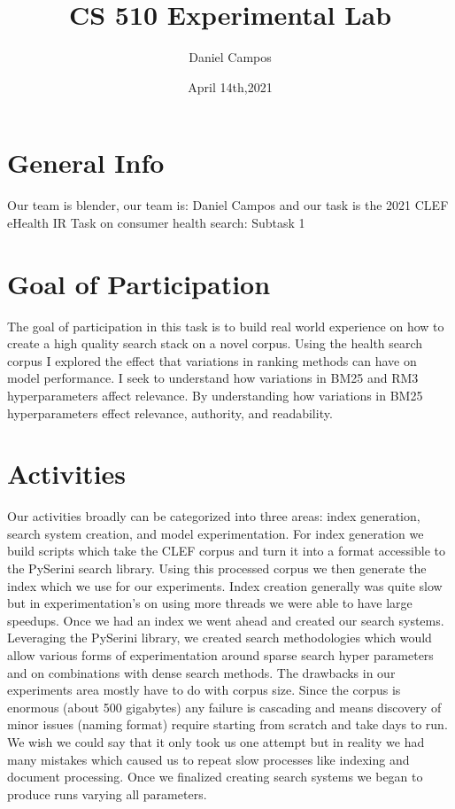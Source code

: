 \documentclass[11pt]{article}
\title{CS 510 Experimental Lab}
\author{Daniel Campos}
\date{April 14th,2021}
\begin{document}
\maketitle
\section{General Info}
Our team is blender, our team is: Daniel Campos and our task is the 2021 CLEF eHealth IR Task on consumer health search: Subtask 1
\section{Goal of Participation}
The goal of participation in this task is to build real world experience on how to create a high quality search stack on a novel corpus. Using the health search corpus I explored the effect that variations in ranking methods can have on model performance. I seek to understand how variations in BM25 and RM3 hyperparameters affect relevance. By understanding how variations in BM25 hyperparameters effect relevance, authority, and readability.
\section{Activities}
Our activities broadly can be categorized into three areas: index generation, search system creation, and model experimentation. For index generation we build scripts which take the CLEF corpus and turn it into a format accessible to the PySerini search library. Using this processed corpus we then generate the index which we use for our experiments. Index creation generally was quite slow but in experimentation's on using more threads we were able to have large speedups. Once we had an index we went ahead and created our search systems. Leveraging the PySerini library, we created search methodologies which would allow various forms of experimentation around sparse search hyper parameters and on combinations with dense search methods. The drawbacks in our experiments area mostly have to do with corpus size. Since the corpus is enormous (about 500 gigabytes) any failure is cascading and means discovery of minor issues (naming format) require starting from scratch and take days to run. We wish we could say that it only took us one attempt but in reality we had many mistakes which caused us to repeat slow processes like indexing and document processing. Once we finalized creating search systems we began to produce runs varying all parameters.
\end{document}
